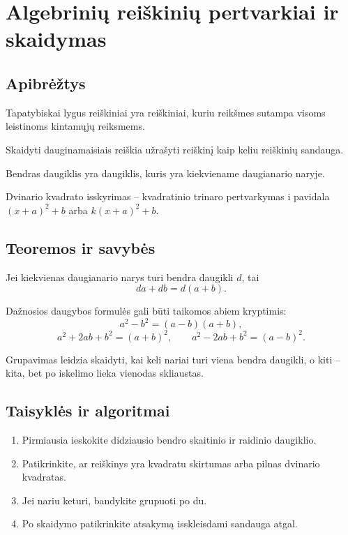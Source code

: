 \section{Algebrinių reiškinių pertvarkiai ir skaidymas}\label{sec:algebriniu-reiskiniu-pertvarkiai-ir-skaidymas}

\subsection{Apibrėžtys}
\begin{apibreztis}
Tapatybiskai lygus reiškiniai yra reiškiniai, kuriu reikšmes sutampa visoms leistinoms kintamųjų reiksmems.
\end{apibreztis}
\begin{apibreztis}
Skaidyti dauginamaisiais reiškia užrašyti reiškinį kaip keliu reiškinių sandauga.
\end{apibreztis}
\begin{apibreztis}
Bendras daugiklis yra daugiklis, kuris yra kiekviename daugianario naryje.
\end{apibreztis}
\begin{apibreztis}
Dvinario kvadrato isskyrimas -- kvadratinio trinaro pertvarkymas i pavidala $(x+a)^2+b$ arba $k(x+a)^2+b$.
\end{apibreztis}

\subsection{Teoremos ir savybės}
\begin{savybe}
Jei kiekvienas daugianario narys turi bendra daugikli $d$, tai
\[
da+db=d(a+b).
\]
\end{savybe}
\begin{savybe}
Dažnosios daugybos formulės gali būti taikomos abiem kryptimis:
\[
a^2-b^2=(a-b)(a+b),
\]
\[
a^2+2ab+b^2=(a+b)^2,\qquad a^2-2ab+b^2=(a-b)^2.
\]
\end{savybe}
\begin{savybe}
Grupavimas leidzia skaidyti, kai keli nariai turi viena bendra daugikli, o kiti -- kita, bet po iskelimo lieka vienodas skliaustas.
\end{savybe}

\subsection{Taisyklės ir algoritmai}
\begin{enumerate}[label=\arabic*.]
\item Pirmiausia ieskokite didziausio bendro skaitinio ir raidinio daugiklio.
\item Patikrinkite, ar reiškinys yra kvadratu skirtumas arba pilnas dvinario kvadratas.
\item Jei nariu keturi, bandykite grupuoti po du.
\item Po skaidymo patikrinkite atsakymą isskleisdami sandauga atgal.
\end{enumerate}
